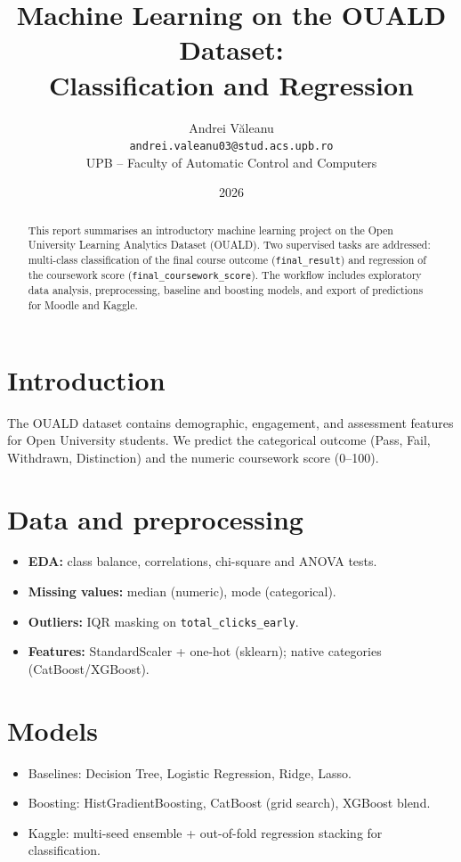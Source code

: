 \documentclass[11pt,a4paper]{article}
\title{Machine Learning on the OUALD Dataset:\\Classification and Regression}
\author{Andrei V\u{a}leanu \\ \texttt{andrei.valeanu03@stud.acs.upb.ro} \\ UPB -- Faculty of Automatic Control and Computers}
\date{2026}
\begin{document}
\maketitle

\begin{abstract}
This report summarises an introductory machine learning project on the Open University Learning Analytics Dataset (OUALD). Two supervised tasks are addressed: multi-class classification of the final course outcome (\texttt{final\_result}) and regression of the coursework score (\texttt{final\_coursework\_score}). The workflow includes exploratory data analysis, preprocessing, baseline and boosting models, and export of predictions for Moodle and Kaggle.
\end{abstract}

\section{Introduction}
The OUALD dataset contains demographic, engagement, and assessment features for Open University students. We predict the categorical outcome (Pass, Fail, Withdrawn, Distinction) and the numeric coursework score (0--100).

\section{Data and preprocessing}
\begin{itemize}
  \item \textbf{EDA:} class balance, correlations, chi-square and ANOVA tests.
  \item \textbf{Missing values:} median (numeric), mode (categorical).
  \item \textbf{Outliers:} IQR masking on \texttt{total\_clicks\_early}.
  \item \textbf{Features:} StandardScaler + one-hot (sklearn); native categories (CatBoost/XGBoost).
\end{itemize}

\section{Models}
\begin{itemize}
  \item Baselines: Decision Tree, Logistic Regression, Ridge, Lasso.
  \item Boosting: HistGradientBoosting, CatBoost (grid search), XGBoost blend.
  \item Kaggle: multi-seed ensemble + out-of-fold regression stacking for classification.
\end{itemize}
\end{document}
